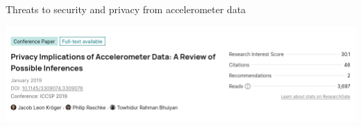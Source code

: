 \documentclass[ucs,9pt,usenames,dvipsnames]{beamer}
\begin{document}
\begin{frame}[fragile]{Threats to security and privacy from accelerometer data}
	
	\includegraphics[width=1\linewidth]{imgs/Privacy Implications of Accelerometer Data A Review of Possible Inferences}
	
\end{frame}
\end{document}
